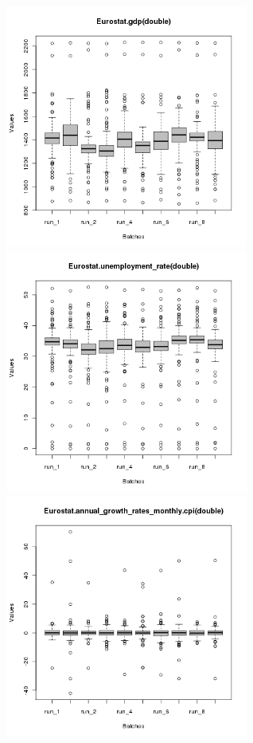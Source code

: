 \begin{figure}[ht!]
\centering\leavevmode
\begin{minipage}{17cm}
\centering\leavevmode
\includegraphics[width=8cm]{./batch/tax_0.05/Eurostat-gdp-runbatch.png}
\includegraphics[width=8cm]{./batch/tax_0.05/Eurostat-unemployment_rate-runbatch.png}\\
\includegraphics[width=8cm]{./batch/tax_0.05/Eurostat-cpi-runbatch.png}

\end{minipage}
\end{figure}
